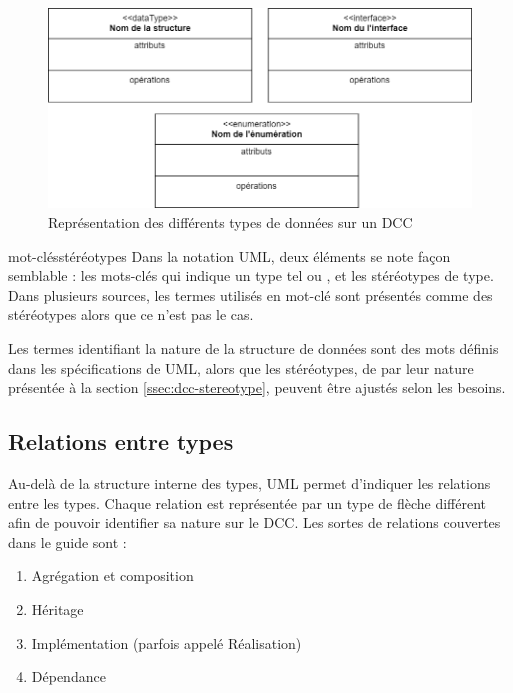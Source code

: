 \begin{figure}[H]
	\caption{Représentation des différents types de données sur un \acrshort{DCC}}
	\centering
	\includegraphics[scale=0.4]{dcc-struct-interface-enum.png}
\end{figure}

\begin{distinction}{mot-clés}{stéréotypes}
	Dans la notation UML, deux éléments se note façon semblable : les mots-clés qui indique un type tel  ou , et les stéréotypes de type. Dans plusieurs sources, les termes utilisés en mot-clé sont présentés comme des stéréotypes alors que ce n'est pas le cas.
	
	Les termes identifiant la nature de la structure de données sont des mots définis dans les spécifications de UML, alors que les stéréotypes, de par leur nature présentée à la section \ref{ssec:dcc-stereotype}, peuvent être ajustés selon les besoins.
\end{distinction}


\subsection{Relations entre types}

Au-delà de la structure interne des types, UML permet d'indiquer les relations entre les types. Chaque relation est représentée par un type de flèche différent afin de pouvoir identifier sa nature sur le \acrshort{DCC}. Les sortes de relations couvertes dans le guide sont :

\begin{enumerate}
	\item Agrégation et composition
	\item Héritage
	\item Implémentation (parfois appelé Réalisation)
	\item Dépendance
\end{enumerate}

